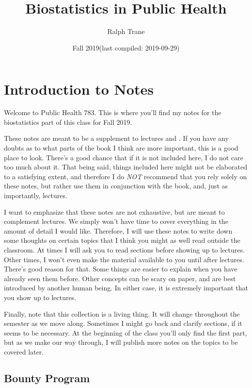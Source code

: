 \documentclass[]{book}
\title{Biostatistics in Public Health}
\author{Ralph Trane}
\date{Fall 2019(last compiled: 2019-09-29)}
\theoremstyle{definition}
\theoremstyle{definition}
\theoremstyle{definition}
\theoremstyle{remark}
\begin{document}
\maketitle

{
\setcounter{tocdepth}{1}
\tableofcontents
}
\hypertarget{introduction-to-notes}{%
\chapter{Introduction to Notes}\label{introduction-to-notes}}

\newcommand{\Var}{\text{Var}}
\newcommand{\var}{\text{var}}
\newcommand{\SD}{\text{SD}}

Welcome to Public Health 783. This is where you'll find my notes for the biostatistics part of this class for Fall 2019.

These notes are meant to be a supplement to lectures and \citet{ls}. If you have any doubts as to what parts of the book I think are more important, this is a good place to look. There's a good chance that if it is not included here, I do not care too much about it. That being said, things included here might not be elaborated to a satisfying extent, and therefore I do \emph{NOT} recommend that you rely solely on these notes, but rather use them in conjunction with the book, and, just as importantly, lectures.

I want to emphasize that these notes are not exhaustive, but are meant to complement lectures. We simply won't have time to cover everything in the amount of detail I would like. Therefore, I will use these notes to write down some thoughts on certain topics that I think you might as well read outside the classroom. At times I will ask you to read sections before showing up to lectures. Other times, I won't even make the material available to you until after lectures. There's good reason for that. Some things are easier to explain when you have already seen them before. Other concepts can be scary on paper, and are best introduced by another human being. In either case, it is extremely important that you show up to lectures.

Finally, note that this collection is a living thing. It will change throughout the semester as we move along. Sometimes I might go back and clarify sections, if it seems to be necessary. At the beginning of the class you'll only find the first part, but as we make our way through, I will publish more notes on the topics to be covered later.

\hypertarget{bounty-program}{%
\section*{Bounty Program}\label{bounty-program}}
\end{document}
